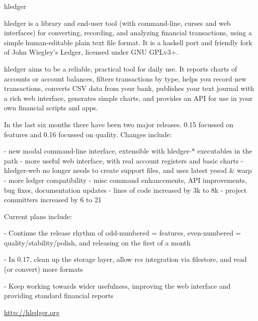 \begin{hcarentry}[updated]{hledger}
\label{hledger}
\makeheader

hledger is a library and end-user tool (with command-line, curses and web
interfaces) for converting, recording, and analyzing financial
transactions, using a simple human-editable plain text file format. It is
a haskell port and friendly fork of John Wiegley's Ledger, licensed under
GNU GPLv3+.

hledger aims to be a reliable, practical tool for daily use. It reports
charts of accounts or account balances, filters transactions by type,
helps you record new transactions, converts CSV data from your bank,
publishes your text journal with a rich web interface, generates simple
charts, and provides an API for use in your own financial scripts and
apps.

In the last six months there have been two major releases. 0.15 focussed
on features and 0.16 focussed on quality. Changes include:

- new modal command-line interface, extensible with hledger-* executables in the path
- more useful web interface, with real account registers and basic charts
- hledger-web no longer needs to create support files, and uses latest yesod & warp
- more ledger compatibility
- misc command enhancements, API improvements, bug fixes, documentation updates
- lines of code increased by 3k to 8k
- project committers increased by 6 to 21

Current plans include:

- Continue the release rhythm of odd-numbered = features, even-numbered =
  quality/stability/polish, and releasing on the first of a month

- In 0.17, clean up the storage layer, allow rcs integration via
  filestore, and read (or convert) more formats

- Keep working towards wider usefulness, improving the web interface and
  providing standard financial reports

\FurtherReading
  \url{http://hledger.org}
\end{hcarentry}

